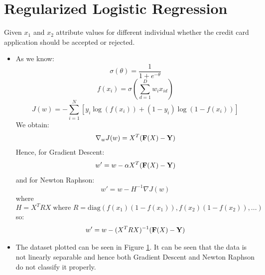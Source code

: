 \documentclass{article}
\begin{document}
\section{Regularized Logistic Regression}
Given $x_1$ and $x_2$ attribute values for different individual whether the credit card application should be accepted or rejected.
\begin{itemize}

\begin{figure}[H]
 \caption{Distribution of the dataset, the positive examples are in blue circles and negative examples in red crossed. The magenta line represents the class boundary obtained using gradient descent (linear classification), similarly the green one for Newton Raphson method.}
 \label{fig:7}
 \end{figure}
 
 \item As we know:
 $$\sigma(\theta) = \frac1{1+e^{-\theta}}$$
 $$f(x_i)=\sigma\left(\sum_{d=1}^Dw_ix_{id}\right)$$
 $$J(w)=-\sum_{i=1}^N[y_i\log(f(x_i))+(1-y_i)\log(1-f(x_i))]$$
 We obtain:
 $$\nabla_wJ(w)=X^T({\bf F}(X)-{\bf Y})$$
 Hence, for Gradient Descent:
 $$w'=w-\alpha X^T({\bf F}(X)-{\bf Y})$$
 and for Newton Raphson:
 $$w' = w-H^{-1}\nabla J(w)$$
 where
 $$H=X^TRX\;\text{where } R=\text{diag}(f(x_1)(1-f(x_1)), f(x_2)(1-f(x_2)), ...)$$
 so:
 $$w' = w - (X^TRX)^{-1}({\bf F}(X)-{\bf Y})$$
 
\item The dataset plotted can be seen in Figure \ref{fig:7}. It can be seen that the data is not linearly separable and hence both Gradient Descent and Newton Raphson do not classify it properly.


\end{itemize}
\end{document}
